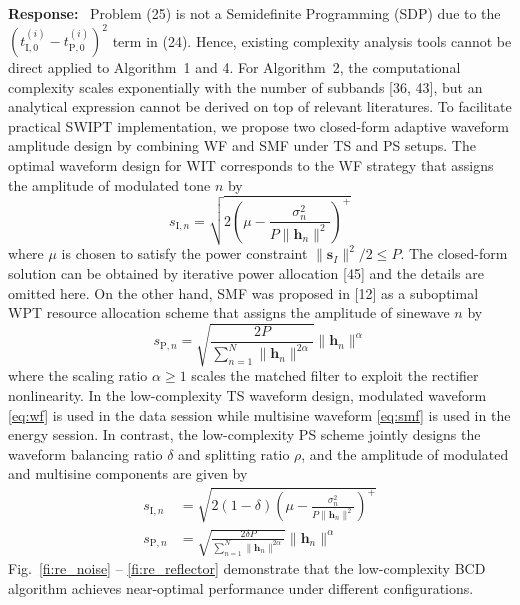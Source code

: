 \documentclass{article}
\newcounter{reviewer}
\newcounter{response}[reviewer]
\newenvironment{response}
	{\refstepcounter{response} \medskip \noindent \textbf{Response:}\ }
	{\medskip}
\begin{document}
\begin{reviewersection}
		\begin{response}
			Problem (25) is not a Semidefinite Programming (SDP) due to the $(t_{\mathrm{I},0}^{(i)} - t_{\mathrm{P},0}^{(i)})^2$ term in (24). Hence, existing complexity analysis tools cannot be direct applied to Algorithm~1 and 4. For Algorithm~2, the computational complexity scales exponentially with the number of subbands [36, 43], but an analytical expression cannot be derived on top of relevant literatures. To facilitate practical SWIPT implementation, we propose two closed-form adaptive waveform amplitude design by combining WF and SMF under TS and PS setups. The optimal waveform design for WIT corresponds to the WF strategy that assigns the amplitude of modulated tone $n$ by
			\begin{equation}\label{eq:wf}
				s_{\mathrm{I}, n} = \sqrt{2\left(\mu - \frac{\sigma_n^2}{P \lVert{\boldsymbol{h}_n}\rVert^2}\right)^+}
			\end{equation}
			where $\mu$ is chosen to satisfy the power constraint $\lVert{\boldsymbol{s}_I}\rVert^2 / 2 \le P$. The closed-form solution can be obtained by iterative power allocation [45] and the details are omitted here. On the other hand, SMF was proposed in [12] as a suboptimal WPT resource allocation scheme that assigns the amplitude of sinewave $n$ by
			\begin{equation}\label{eq:smf}
				s_{\mathrm{P}, n} = \sqrt{\frac{2 P}{\sum_{n=1}^N \lVert{\boldsymbol{h}_n \rVert^{2 \alpha}}}}\lVert{\boldsymbol{h}_n}\rVert^\alpha
			\end{equation}
			where the scaling ratio $\alpha \ge 1$ scales the matched filter to exploit the rectifier nonlinearity. In the low-complexity TS waveform design, modulated waveform \eqref{eq:wf} is used in the data session while multisine waveform \eqref{eq:smf} is used in the energy session. In contrast, the low-complexity PS scheme jointly designs the waveform balancing ratio $\delta$ and splitting ratio $\rho$, and the amplitude of modulated and multisine components are given by
			\begin{align}
				s_{\mathrm{I}, n} &= \sqrt{2(1 - \delta)\left(\mu - \frac{\sigma_n^2}{P \lVert{\boldsymbol{h}_n}\rVert^2}\right)^+} \label{eq:s_i}\\
				s_{\mathrm{P}, n} &= \sqrt{\frac{2 \delta P}{\sum_{n=1}^N \lVert{\boldsymbol{h}_n \rVert^{2 \alpha}}}}\lVert{\boldsymbol{h}_n}\rVert^\alpha \label{eq:s_p}
			\end{align}
			Fig.~\ref{fi:re_noise} -- \ref{fi:re_reflector} demonstrate that the low-complexity BCD algorithm achieves near-optimal performance under different configurations.


\end{response}
\end{reviewersection}
\end{document}
